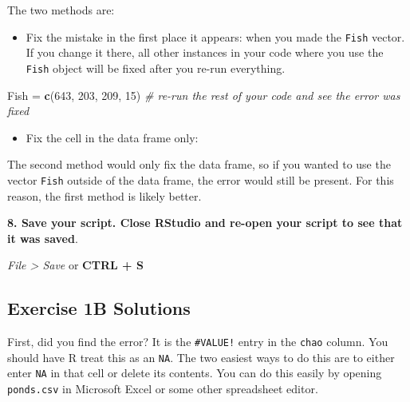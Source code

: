 \documentclass[]{book}
\newenvironment{Shaded}{\begin{snugshade}}{\end{snugshade}}
\newcommand{\KeywordTok}[1]{\textcolor[rgb]{0.13,0.29,0.53}{\textbf{#1}}}
\newcommand{\DecValTok}[1]{\textcolor[rgb]{0.00,0.00,0.81}{#1}}
\newcommand{\StringTok}[1]{\textcolor[rgb]{0.31,0.60,0.02}{#1}}
\newcommand{\CommentTok}[1]{\textcolor[rgb]{0.56,0.35,0.01}{\textit{#1}}}
\newcommand{\OperatorTok}[1]{\textcolor[rgb]{0.81,0.36,0.00}{\textbf{#1}}}
\newcommand{\NormalTok}[1]{#1}
\providecommand{\tightlist}{%
  \setlength{\itemsep}{0pt}\setlength{\parskip}{0pt}}
\theoremstyle{definition}
\theoremstyle{definition}
\theoremstyle{definition}
\theoremstyle{remark}
\begin{document}
The two methods are:

\begin{itemize}
\tightlist
\item
  Fix the mistake in the first place it appears: when you made the
  \texttt{Fish} vector. If you change it there, all other instances in
  your code where you use the \texttt{Fish} object will be fixed after
  you re-run everything.
\end{itemize}

\begin{Shaded}
\begin{Highlighting}[]
\NormalTok{Fish =}\StringTok{ }\KeywordTok{c}\NormalTok{(}\DecValTok{643}\NormalTok{, }\DecValTok{203}\NormalTok{, }\DecValTok{209}\NormalTok{, }\DecValTok{15}\NormalTok{)}
\CommentTok{# re-run the rest of your code and see the error was fixed}
\end{Highlighting}
\end{Shaded}

\begin{itemize}
\tightlist
\item
  Fix the cell in the data frame only:
\end{itemize}

\begin{Shaded}
\end{Shaded}

The second method would only fix the data frame, so if you wanted to use
the vector \texttt{Fish} outside of the data frame, the error would
still be present. For this reason, the first method is likely better.

\textbf{8. Save your script. Close RStudio and re-open your script to
see that it was saved}.

\emph{File \textgreater{} Save} or \textbf{CTRL + S}

\hypertarget{ex1b-answers}{\subsection*{Exercise 1B
Solutions}\label{ex1b-answers}}

First, did you find the error? It is the \texttt{\#VALUE!} entry in the
\texttt{chao} column. You should have R treat this as an \texttt{NA}.
The two easiest ways to do this are to either enter \texttt{NA} in that
cell or delete its contents. You can do this easily by opening
\texttt{ponds.csv} in Microsoft Excel or some other spreadsheet editor.
\end{document}
